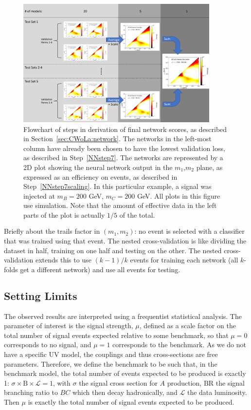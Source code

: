 \begin{figure}[t!]
    \centering
    \includegraphics[width=0.9\textwidth]{figures_CWoLa/split_flowchart.pdf}
    \caption{Flowchart of steps in derivation of final network scores, as described in Section~\ref{sec:CWoLa:network}. The networks in the left-most column have already been chosen to have the lowest validation loss, as described in Step~\ref{NNstep7}. The networks are represented by a 2D plot showing the neural network output in the $m_1$,$m_2$ plane, as expressed as an efficiency on events, as described in Step~\ref{NNstep7scaling}. In this particular example, a signal was injected at $m_B=200$ GeV, $m_C=200$ GeV.  All plots in this figure use simulation.  Note that the amount of effective data in the left parts of the plot is actually $1/5$ of the total.}
    \label{fig:CWoLa:flowchart}
\end{figure}

Briefly about the trails factor in $(m_1,m_2)$: no event is selected with a classifier that was trained using that event.  The nested cross-validation is like dividing the dataset in half, training on one half and testing on the other.  The nested cross-validation extends this to use $(k-1)/k$ events for training each network (all $k$-folds get a different network) and use all events for testing. 

\subsection{Setting Limits}
\label{sec:CWoLa:limits}

The observed results are interpreted using a frequentist statistical analysis.
The parameter of interest is the signal strength, $\mu$, defined as a scale factor on the total number of signal events expected relative to some benchmark, so that $\mu=0$ corresponds to no signal, and $\mu=1$ corresponds to the benchmark.
As we do not have a specific UV model, the couplings and thus cross-sections are free parameters.  Therefore, we define the benchmark to be such that, in the benchmark model, the total number of events expected to be produced is exactly 1: $\sigma\times\text{B}\times\mathcal{L}=1$, with $\sigma$ the signal cross section for $A$ production, $\text{BR}$ the signal branching ratio to $BC$ which then decay hadronically, and $\mathcal{L}$ the data luminosity.
Then $\mu$ is exactly the total number of signal events expected to be produced.

